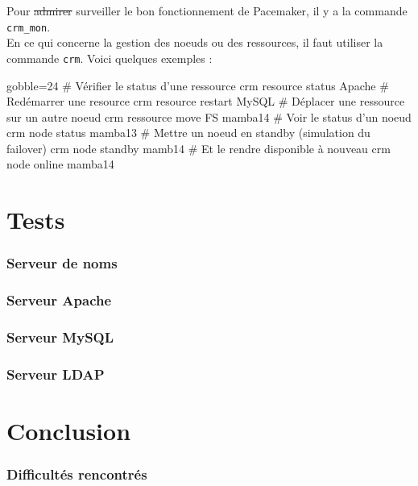 \documentclass[11pt,a4paper]{report}
\begin{document}
                    Pour \st{admirer} surveiller le bon fonctionnement de Pacemaker, il y a la commande \verb+crm_mon+.\\
                
                    En ce qui concerne la gestion des noeuds ou des ressources, il faut utiliser la commande \verb+crm+. Voici quelques exemples :\\
                
                    \begin{bashcode*}{gobble=24}
                        # Vérifier le status d'une ressource
                        crm resource status Apache
                        # Redémarrer une resource
                        crm resource restart MySQL
                        # Déplacer une ressource sur un autre noeud
                        crm ressource move FS mamba14
                        # Voir le status d'un noeud
                        crm node status mamba13
                        # Mettre un noeud en standby (simulation du failover)
                        crm node standby mamb14
                        # Et le rendre disponible à nouveau
                        crm node online mamba14
                    \end{bashcode*}

    \part{Tests}
        \section{Serveur de noms}
        \section{Serveur Apache}
        \section{Serveur MySQL}
        \section{Serveur LDAP}
    \part{Conclusion}
        \section{Difficultés rencontrés}
            
\end{document}
